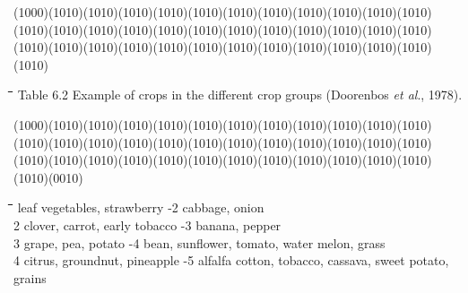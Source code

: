 \documentclass[11pt]{article}
\begin{document}
\GrBox(1000)\GrBox(1010)\GrBox(1010)\GrBox(1010)\GrBox(1010)\GrBox(1010)\GrBox(1010)\GrBox(1010)\GrBox(1010)\GrBox(1010)\GrBox(1010)\GrBox(1010)\GrBox(1010)\GrBox(1010)\GrBox(1010)\GrBox(1010)\GrBox(1010)\GrBox(1010)\GrBox(1010)\GrBox(1010)\GrBox(1010)\GrBox(1010)\GrBox(1010)\GrBox(1010)\GrBox(1010)\GrBox(1010)\GrBox(1010)\GrBox(1010)\GrBox(1010)\GrBox(1010)\GrBox(1010)\GrBox(1010)\GrBox(1010)\GrBox(1010)\GrBox(1010)\GrBox(1010)\GrBox(1010)\-

\bigskip
\nwln
\begin{tabbing}
\hspace{1.27cm}\=\hspace{1.27cm}\=\hspace{1.27cm}\=\hspace{1.27cm}\=%
\hspace{1.27cm}\=\hspace{1.27cm}\=\hspace{1.27cm}\=\hspace{1.27cm}\=%
\hspace{1.27cm}\=\hspace{1.27cm}\=\kill
Table 6.2\> \> Example of crops in the different crop groups (Doorenbos {\it et al\/}., 1978).
\end{tabbing}
\GrBox(1000)\GrBox(1010)\GrBox(1010)\GrBox(1010)\GrBox(1010)\GrBox(1010)\GrBox(1010)\GrBox(1010)\GrBox(1010)\GrBox(1010)\GrBox(1010)\GrBox(1010)\GrBox(1010)\GrBox(1010)\GrBox(1010)\GrBox(1010)\GrBox(1010)\GrBox(1010)\GrBox(1010)\GrBox(1010)\GrBox(1010)\GrBox(1010)\GrBox(1010)\GrBox(1010)\GrBox(1010)\GrBox(1010)\GrBox(1010)\GrBox(1010)\GrBox(1010)\GrBox(1010)\GrBox(1010)\GrBox(1010)\GrBox(1010)\GrBox(1010)\GrBox(1010)\GrBox(1010)\GrBox(1010)\GrBox(0010)\nwln
\begin{tabbing}
\hspace{1.27cm}\=\hspace{1.27cm}\=\hspace{1.27cm}\=\hspace{1.27cm}\=%
\hspace{1.27cm}\=\hspace{1.27cm}\=\hspace{1.27cm}\=\hspace{1.27cm}\=%
\hspace{1.27cm}\=\hspace{1.27cm}\=  leaf vegetables, strawberry\> \> \> \> -2  cabbage, onion\\
2  clover, carrot, early tobacco\> \> \> \> -3  banana, pepper\\
3  grape, pea, potato\> \> \> \> -4  bean, sunflower, tomato, water melon, grass\\
4  citrus, groundnut, pineapple\> \> \> \> -5  alfalfa cotton, tobacco, cassava, sweet potato, grains
\end{tabbing}
\end{document}
